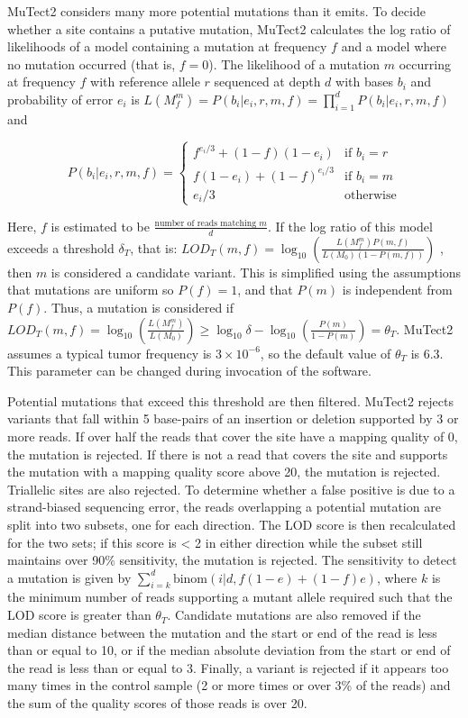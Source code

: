 MuTect2 considers many more potential mutations than it emits. To decide whether a site contains a putative mutation, MuTect2 calculates the log ratio of likelihoods of a model containing a mutation at frequency $f$ and a model where no mutation occurred (that is, $f = 0$). The likelihood of a mutation $m$ occurring at frequency $f$ with reference allele $r$ sequenced at depth $d$ with bases $b_i$ and probability of error $e_i$ is $L(M_f^m)=P({b_i}|{e_i},r,m,f)=\prod_{i=1}^{d} P(b_i|e_i,r,m,f)$ and 

$$
P(b_i|e_i,r,m,f)=
\begin{cases}
f^{e_i/3}+(1-f)(1-e_i) & \text{if } b_i=r \\
f(1-e_i) + (1-f)^{e_i/3} & \text{if } b_i=m \\
e_i/3 & \text{otherwise}
\end{cases}
$$

Here, $f$ is estimated to be $\frac{\text{number of reads matching }m}{d}$.
If the log ratio of this model exceeds a threshold $\delta{}_T$, that is: $LOD_T(m,f)=\log_{10} \left(\frac{L(M_f^m)P(m,f)}{L(M_0)(1-P(m,f))}\right)$ , then $m$ is considered a candidate variant. This is simplified using the assumptions that mutations are uniform so $P(f)=1$, and that $P(m)$ is independent from $P(f)$. Thus, a mutation is considered if $LOD_T(m,f)=\log_{10} \left(\frac{L(M_f^m)}{L(M_0)}\right) \geq \log_{10} \delta{} - \log_{10}  \left(\frac{P(m)}{1-P(m)}\right) = \theta{}_T$. MuTect2 assumes a typical tumor frequency is $3 \times 10^{-6}$, so the default value of $\theta{}_T$ is 6.3. This parameter can be changed during invocation of the software.

Potential mutations that exceed this threshold are then filtered. MuTect2 rejects variants that fall within 5 base-pairs of an insertion or deletion supported by 3 or more reads. If over half the reads that cover the site have a mapping quality of 0, the mutation is rejected. If there is not a read that covers the site and supports the mutation with a mapping quality score above 20, the mutation is rejected. Triallelic sites are also rejected. To determine whether a false positive is due to a strand-biased sequencing error, the reads overlapping a potential mutation are split into two subsets, one for each direction. The LOD score is then recalculated for the two sets; if this score is < 2 in either direction while the subset still maintains over 90\% sensitivity, the mutation is rejected. The sensitivity to detect a mutation is given by $\sum_{i=k}^d \text{binom}(i|d,f(1-e)+(1-f)e)$, where $k$ is the minimum number of reads supporting a mutant allele required such that the LOD score is greater than $\theta{}_T$. Candidate mutations are also removed if the median distance between the mutation and the start or end of the read is less than or equal to 10, or if the median absolute deviation from the start or end of the read is less than or equal to 3. Finally, a variant is rejected if it appears too many times in the control sample (2 or more times or over 3\% of the reads) and the sum of the quality scores of those reads is over 20.

